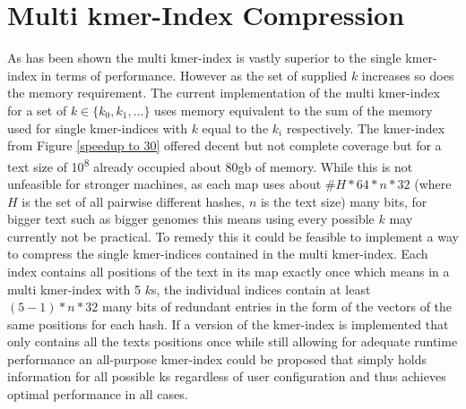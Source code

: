 \section{Multi kmer-Index Compression}
As has been shown the multi kmer-index is vastly superior to the single kmer-index in terms of performance.
However as the set of supplied $k$ increases so does the memory requirement. The current implementation of the
multi kmer-index for a set of $k\in\{k_{0}, k_{1}, ...\}$ uses memory equivalent to the sum of the memory used for
single kmer-indices with $k$ equal to the $k_{i}$ respectively.  The
kmer-index from Figure \ref{speedup to 30} offered decent but not complete coverage but for a text
size of 10\textsuperscript{8} already occupied about 80gb of memory. While this is not unfeasible for stronger machines,
as each map uses about $\#H*64*n*32$ (where $H$ is the set of all pairwise different
hashes, $n$ is the text size) many bits, for bigger text such
as bigger genomes this means using every possible $k$ may currently not be
practical.  To remedy this it could be feasible to implement a way
to compress the single kmer-indices contained in the multi kmer-index.
Each index contains all positions of the text in its map exactly
once which means in a multi kmer-index with 5 $k$s, the individual indices
contain at least $(5-1)*n*32$ many bits of redundant entries in the
form of the vectors of the same positions for each hash. If a version of the
kmer-index is implemented that only contains all the texts positions
once while still allowing for adequate runtime performance an all-purpose
kmer-index could be proposed that simply holds information for all
possible ks regardless of user configuration and thus achieves optimal
performance in all cases.


